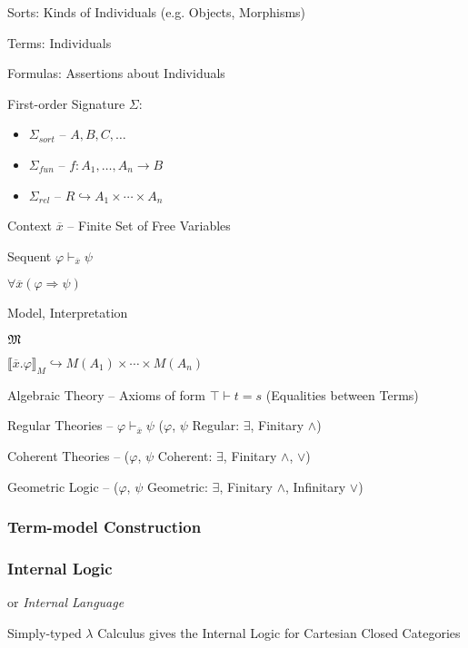 Sorts: Kinds of Individuals (e.g. Objects, Morphisms) %

Terms: Individuals

Formulas: Assertions about Individuals


First-order Signature $\Sigma$:
\begin{itemize}
  \item $\Sigma_{sort}$ -- $A,B,C,\ldots$
  \item $\Sigma_{fun}$ -- $f : A_1, \ldots, A_n \rightarrow B$
  \item $\Sigma_{rel}$ -- $R \hookrightarrow A_1 \times \cdots \times
    A_n$
\end{itemize}

Context $\overline{x}$ -- Finite Set of Free Variables

Sequent $\varphi \vdash_{\overline{x}} \psi$

$\forall \overline{x} (\varphi \Rightarrow \psi)$

Model, Interpretation

$\mathfrak{M}$

$\llbracket \overline{x}.\varphi \rrbracket_M \hookrightarrow M(A_1)
\times \cdots \times M(A_n)$


Algebraic Theory -- Axioms of form $\top \vdash t = s$ (Equalities
between Terms)

Regular Theories -- $\varphi \vdash_{\overline{x}} \psi$ ($\varphi$,
$\psi$ Regular: $\exists$, Finitary $\wedge$)

Coherent Theories -- ($\varphi$, $\psi$ Coherent: $\exists$, Finitary
$\wedge$, $\vee$)

Geometric Logic -- ($\varphi$, $\psi$ Geometric: $\exists$, Finitary
$\wedge$, Infinitary $\vee$)




\subsubsection{Term-model Construction}\label{sec:term_model}

\subsubsection{Internal Logic}\label{sec:internal_logic}

or \emph{Internal Language}

Simply-typed $\lambda$ Calculus gives the Internal Logic for
Cartesian Closed Categories

